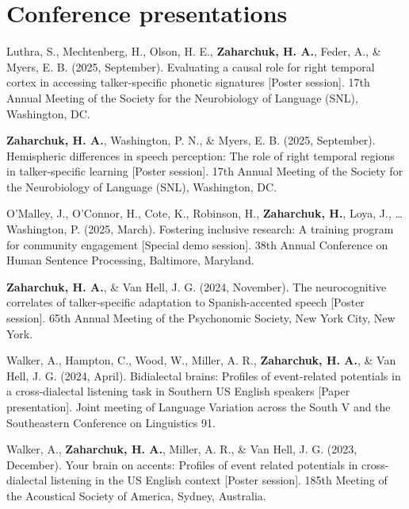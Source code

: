 \documentclass[11pt,a4paper,]{awesome-cv}
\newlength{\cslhangindent}
\newenvironment{CSLReferences}[2] %
 {\begin{list}{}{%
  \setlength{\itemindent}{0pt}
  \setlength{\leftmargin}{0pt}
  \setlength{\parsep}{0pt}
  \ifodd #1
   \setlength{\leftmargin}{\cslhangindent}
   \setlength{\itemindent}{-1\cslhangindent}
  \fi
  \setlength{\itemsep}{#2\baselineskip}}}
 {\end{list}}
\begin{document}
\section{Conference presentations}\label{conference-presentations}

\label{refs-b9cea82cda0234357d83c2877df6034e}
\begin{CSLReferences}{1}{0}
Luthra, S., Mechtenberg, H., Olson, H. E., \textbf{\textbf{Zaharchuk, H.} A.}, Feder, A.,
\& Myers, E. B. (2025, September). Evaluating a causal role for right
temporal cortex in accessing talker-specific phonetic signatures
{[}Poster session{]}. 17th Annual Meeting of the Society for the
Neurobiology of Language (SNL), Washington, DC.

\textbf{\textbf{Zaharchuk, H.} A.}, Washington, P. N., \& Myers, E. B. (2025, September).
Hemispheric differences in speech perception: The role of right temporal
regions in talker-specific learning {[}Poster session{]}. 17th Annual
Meeting of the Society for the Neurobiology of Language (SNL),
Washington, DC.

O'Malley, J., O'Connor, H., Cote, K., Robinson, H., \textbf{Zaharchuk, H.}, Loya,
J., \ldots{} Washington, P. (2025, March). Fostering inclusive research:
A training program for community engagement {[}Special demo session{]}.
38th Annual Conference on Human Sentence Processing, Baltimore,
Maryland.

\textbf{\textbf{Zaharchuk, H.} A.}, \& Van Hell, J. G. (2024, November). The
neurocognitive correlates of talker-specific adaptation to
Spanish-accented speech {[}Poster session{]}. 65th Annual Meeting of the
Psychonomic Society, New York City, New York.

Walker, A., Hampton, C., Wood, W., Miller, A. R., \textbf{\textbf{Zaharchuk, H.} A.}, \&
Van Hell, J. G. (2024, April). Bidialectal brains: Profiles of
event-related potentials in a cross-dialectal listening task in Southern
US English speakers {[}Paper presentation{]}. Joint meeting of Language
Variation across the South V and the Southeastern Conference on
Linguistics 91.

Walker, A., \textbf{\textbf{Zaharchuk, H.} A.}, Miller, A. R., \& Van Hell, J. G. (2023,
December). Your brain on accents: Profiles of event related potentials
in cross-dialectal listening in the US English context {[}Poster
session{]}. 185th Meeting of the Acoustical Society of America, Sydney,
Australia.


\end{CSLReferences}
\end{document}
